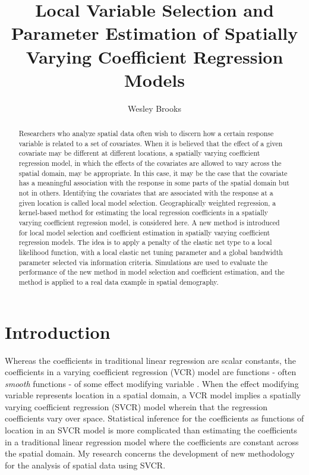 \documentclass[authoryear, review, 11pt]{elsarticle}
\title{Local Variable Selection and Parameter Estimation of Spatially Varying Coefficient Regression Models}
\author{Wesley Brooks}
\date{}                                           %
\begin{document}
\begin{abstract}
Researchers who analyze spatial data often wish to discern how a certain response variable is related to a set of covariates. When it is believed that the effect of a given covariate may be different at different locations, a spatially varying coefficient regression model, in which the effects of the covariates are allowed to vary across the spatial domain, may be appropriate. In this case, it may be the case that the covariate has a meaningful association with the response in some parts of the spatial domain but not in others. Identifying the covariates that are associated with the response at a given location is called local model selection. Geographically weighted regression, a kernel-based method for estimating the local regression coefficients in a spatially varying coefficient regression model, is considered here. A new method is introduced for local model selection and coefficient estimation in spatially varying coefficient regression models. The idea is to apply a penalty of the elastic net type to a local likelihood function, with a local elastic net tuning parameter and a global bandwidth parameter selected via information criteria. Simulations are used to evaluate the performance of the new method in model selection and coefficient estimation, and the method is applied to a real data example in spatial demography.
\end{abstract}

\maketitle



\section{Introduction}
	Whereas the coefficients in traditional linear regression are scalar constants, the coefficients in a varying coefficient regression (VCR) model are functions - often \emph{smooth} functions - of some effect modifying variable \citep{Hastie:1993a}. When the effect modifying variable represents location in a spatial domain, a VCR model implies a spatially varying coefficient regression (SVCR) model wherein that the regression coefficients vary over space. Statistical inference for the coefficients as functions of location in an SVCR model is more complicated than estimating the coefficients in a traditional linear regression model where the coefficients are constant across the spatial domain. My research concerns the development of new methodology for the analysis of spatial data using SVCR.
	
\end{document}
